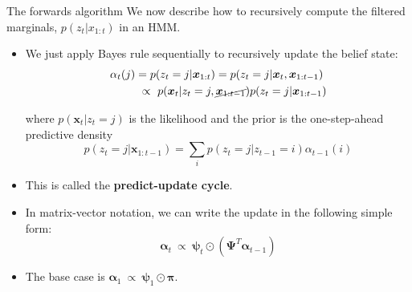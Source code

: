 \documentclass[10pt,mathserif]{beamer}
\begin{document}
\begin{frame}{The forwards algorithm}
We now describe how to recursively compute the filtered marginals, $p(z_t|x_{1:t})$ in an HMM. 

\begin{itemize}
    \item We just apply Bayes rule sequentially to recursively update the belief state:
    \begin{equation*}
        \begin{split}
            \alpha_t(j) & = p(z_t = j|\bm{x}_{1:t}) = p(z_t = j|\bm{x}_t,\bm{x}_{1:t-1})\\
            & \ \propto \ p(\bm{x}_t|z_t = j, \cancel{\bm{x}_{1:t-1}})p(z_t = j|\bm{x}_{1:t-1})
        \end{split}
    \end{equation*}
    
    where $p(\bm{x}_t|z_t = j)$ is the likelihood and the prior is the one-step-ahead predictive density
    \begin{equation*}
        p(z_t = j|\bm{x}_{1:t-1}) = \sum_i p(z_t=j|z_{t-1}=i)\alpha_{t-1}(i)
    \end{equation*}
    
    \item This is called the \textbf{predict-update cycle}.
    \item In matrix-vector notation, we can write the update in the following simple form:
    \begin{equation*}
        \bm{\alpha}_t \ \propto \ \bm{\psi}_t \odot (\bm{\Psi}^T \bm{\alpha}_{t-1})
    \end{equation*}
    
    \item The base case is $\bm{\alpha}_1 \ \propto \ \bm{\psi}_1 \odot \bm{\pi}$. 
\end{itemize}
\end{frame}
\end{document}
